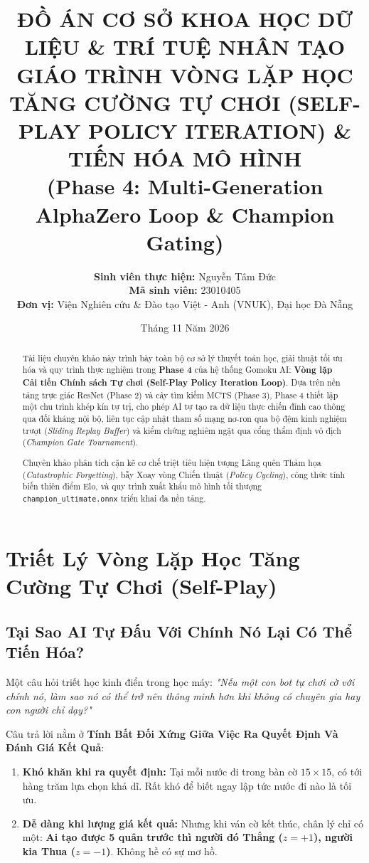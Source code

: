 \documentclass[12pt,a4paper,oneside]{report}
\title{
    \vspace{-1.5cm}
    \textbf{\Large ĐỒ ÁN CƠ SỞ KHOA HỌC DỮ LIỆU \& TRÍ TUỆ NHÂN TẠO}\\
    \vspace{0.8cm}
    \textbf{\Huge GIÁO TRÌNH VÒNG LẶP HỌC TĂNG CƯỜNG TỰ CHƠI (SELF-PLAY POLICY ITERATION) \& TIẾN HÓA MÔ HÌNH}\\
    \vspace{0.5cm}
    \textbf{\LARGE (Phase 4: Multi-Generation AlphaZero Loop \& Champion Gating)}
}
\author{
    \textbf{Sinh viên thực hiện:} Nguyễn Tâm Đức\\
    \textbf{Mã sinh viên:} 23010405\\
    \textbf{Đơn vị:} Viện Nghiên cứu \& Đào tạo Việt - Anh (VNUK), Đại học Đà Nẵng
}
\date{Tháng 11 Năm 2026}
\begin{document}
\maketitle

\begin{abstract}
Tài liệu chuyên khảo này trình bày toàn bộ cơ sở lý thuyết toán học, giải thuật tối ưu hóa và quy trình thực nghiệm trong \textbf{Phase 4} của hệ thống Gomoku AI: \textbf{Vòng lặp Cải tiến Chính sách Tự chơi (Self-Play Policy Iteration Loop)}. Dựa trên nền tảng trực giác ResNet (Phase 2) và cây tìm kiếm MCTS (Phase 3), Phase 4 thiết lập một chu trình khép kín tự trị, cho phép AI tự tạo ra dữ liệu thực chiến đỉnh cao thông qua đối kháng nội bộ, liên tục cập nhật tham số mạng nơ-ron qua bộ đệm kinh nghiệm trượt (\textit{Sliding Replay Buffer}) và kiểm chứng nghiêm ngặt qua cổng thẩm định vô địch (\textit{Champion Gate Tournament}). 

Chuyên khảo phân tích cặn kẽ cơ chế triệt tiêu hiện tượng Lãng quên Thảm họa (\textit{Catastrophic Forgetting}), bẫy Xoay vòng Chiến thuật (\textit{Policy Cycling}), công thức tính biến thiên điểm Elo, và quy trình xuất khẩu mô hình tối thượng \texttt{champion\_ultimate.onnx} triển khai đa nền tảng.
\end{abstract}

\tableofcontents
\newpage

\chapter{Triết Lý Vòng Lặp Học Tăng Cường Tự Chơi (Self-Play)}

\section{Tại Sao AI Tự Đấu Với Chính Nó Lại Có Thể Tiến Hóa?}

Một câu hỏi triết học kinh điển trong học máy: \textit{"Nếu một con bot tự chơi cờ với chính nó, làm sao nó có thể trở nên thông minh hơn khi không có chuyên gia hay con người chỉ dạy?"}

Câu trả lời nằm ở \textbf{Tính Bất Đối Xứng Giữa Việc Ra Quyết Định Và Đánh Giá Kết Quả}:
\begin{enumerate}
    \item \textbf{Khó khăn khi ra quyết định:} Tại mỗi nước đi trong bàn cờ $15 \times 15$, có tới hàng trăm lựa chọn khả dĩ. Rất khó để biết ngay lập tức nước đi nào là tối ưu.
    \item \textbf{Dễ dàng khi lượng giá kết quả:} Nhưng khi ván cờ kết thúc, chân lý chỉ có một: \textbf{Ai tạo được 5 quân trước thì người đó Thắng ($z = +1$), người kia Thua ($z = -1$)}. Không hề có sự mơ hồ.
\end{enumerate}
\end{document}
